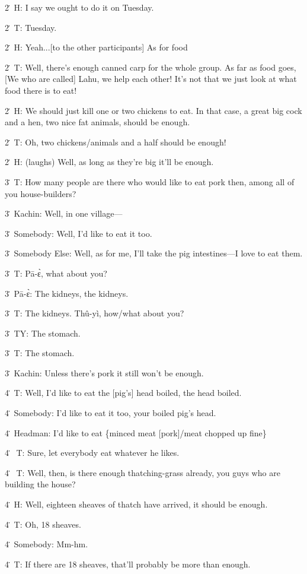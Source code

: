 2\. H: I say we ought to do it on Tuesday.

2\. T: Tuesday.

2\. H: Yeah...[to the other participants] As for food

2\. T: Well, there's enough canned carp for the whole group.  As far as food goes,
[We who are called] Lahu, we help each other!  It's not that we just look at what
food there is to eat!

2\. H: We should just kill one or two chickens to eat.  In that case, a great big
cock and a hen, two nice fat animals, should be enough.

2\. T: Oh, two chickens/animals and a half should be enough!

2\. H: (laughs) Well, as long as they're big it'll be enough.

3\. T: How many people are there who would like to eat pork then, among all of
you house-builders?

3\. Kachin: Well, in one village---

3\. Somebody: Well, I'd like to eat it too.

3\. Somebody Else: Well, as for me, I'll take the pig intestines---I love to eat
them.

3\. T: Pā-ɛ̀, what about you?

3\. Pā-ɛ̀: The kidneys, the kidneys.

3\. T: The kidneys. Thû-yì, how/what about you?

3\. TY: The stomach.

3\. T: The stomach.

3\. Kachin: Unless there's pork it still won't be enough.

4\. T: Well, I'd like to eat the [pig's] head boiled, the head boiled.

4\. Somebody: I'd like to eat it too, your boiled pig's head.

4\. Headman: I'd like to eat \{minced meat [pork]/meat chopped up fine\}

4\. ⎰T: Sure, let everybody eat whatever he likes.

4\. ⎱T: Well, then, is there enough thatching-grass already, you guys who are
building the house?

4\. H: Well, eighteen sheaves of thatch have arrived, it should be enough.

4\. T: Oh, 18 sheaves.

4\. Somebody: Mm-hm.

4\. T: If there are 18 sheaves, that'll probably be more than enough.

